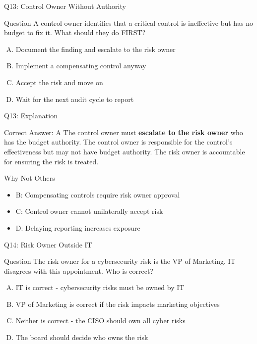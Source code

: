 \documentclass{beamer}
\begin{document}
	\begin{frame}{Q13: Control Owner Without Authority}
		\begin{block}{Question}
			A control owner identifies that a critical control is ineffective but has no budget to fix it. What should they do FIRST?
		\end{block}
		\begin{enumerate}[(A)]
			\item Document the finding and escalate to the risk owner
			\item Implement a compensating control anyway
			\item Accept the risk and move on
			\item Wait for the next audit cycle to report
		\end{enumerate}
	\end{frame}
	
	\begin{frame}{Q13: Explanation}
		\begin{block}{Correct Answer: A}
			The control owner must \textbf{escalate to the risk owner} who has the budget authority. The control owner is responsible for the control's effectiveness but may not have budget authority. The risk owner is accountable for ensuring the risk is treated.
		\end{block}
		\begin{block}{Why Not Others}
			\begin{itemize}
				\item B: Compensating controls require risk owner approval
				\item C: Control owner cannot unilaterally accept risk
				\item D: Delaying reporting increases exposure
			\end{itemize}
		\end{block}
	\end{frame}
	
	\begin{frame}{Q14: Risk Owner Outside IT}
		\begin{block}{Question}
			The risk owner for a cybersecurity risk is the VP of Marketing. IT disagrees with this appointment. Who is correct?
		\end{block}
		\begin{enumerate}[(A)]
			\item IT is correct - cybersecurity risks must be owned by IT
			\item VP of Marketing is correct if the risk impacts marketing objectives
			\item Neither is correct - the CISO should own all cyber risks
			\item The board should decide who owns the risk
		\end{enumerate}
	\end{frame}
	
\end{document}
